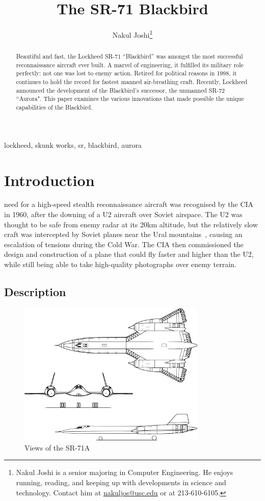 \documentclass[12pt, draftclsnofoot, onecolumn]{IEEEtran}
\title{The SR-71 Blackbird}
\author{Nakul Joshi\thanks{
	Nakul Joshi is a senior majoring in Computer Engineering. He enjoys running, reading, and keeping up with developments in science and technology. Contact him at \href{mailto:nakuljos@usc.edu}{nakuljos@usc.edu} or at 213-610-6105.
}}
\begin{document}
\maketitle

\begin{abstract}
	Beautiful and fast, the Lockheed SR-71 ``Blackbird'' was amongst the most successful reconnaissance aircraft ever built. A marvel of engineering, it fulfilled its military role perfectly: not one was lost to enemy action. Retired for political reasons in 1998, it continues to hold the record for fastest manned air-breathing craft. Recently, Lockheed announced the development of the Blackbird's successor, the unmanned SR-72 ``Aurora". This paper examines the various innovations that made possible the unique capabilities of the Blackbird.
\end{abstract}

\begin{IEEEkeywords} lockheed, skunk works, sr, blackbird, aurora \end{IEEEkeywords}



\section{Introduction}

	 need for a high-speed stealth reconnaissance aircraft was recognised by the CIA in 1960, after the downing of a U2 aircraft over Soviet airspace. The U2 was thought to be safe from enemy radar at its 20km altitude, but the relatively slow craft was intercepted by Soviet planes near the Ural mountains~\cite{u2}, causing an escalation of tensions during the Cold War. The CIA then commissioned the design and construction of a plane that could fly faster and higher than the U2, while still being able to take high-quality photographs over enemy terrain.	
	
	\subsection{Description}

	\begin{figure}[h]
		\centering
		\includegraphics[width=0.8\textwidth]{view.pdf}
		\caption{Views of the SR-71A}
	\end{figure}
\end{document}

